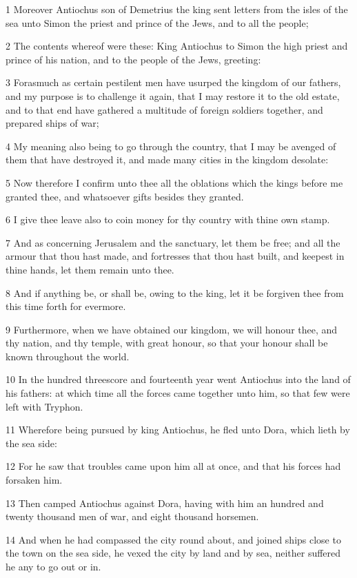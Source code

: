 \par 1 Moreover Antiochus son of Demetrius the king sent letters from the isles of the sea unto Simon the priest and prince of the Jews, and to all the people;
\par 2 The contents whereof were these: King Antiochus to Simon the high priest and prince of his nation, and to the people of the Jews, greeting:
\par 3 Forasmuch as certain pestilent men have usurped the kingdom of our fathers, and my purpose is to challenge it again, that I may restore it to the old estate, and to that end have gathered a multitude of foreign soldiers together, and prepared ships of war;
\par 4 My meaning also being to go through the country, that I may be avenged of them that have destroyed it, and made many cities in the kingdom desolate:
\par 5 Now therefore I confirm unto thee all the oblations which the kings before me granted thee, and whatsoever gifts besides they granted.
\par 6 I give thee leave also to coin money for thy country with thine own stamp.
\par 7 And as concerning Jerusalem and the sanctuary, let them be free; and all the armour that thou hast made, and fortresses that thou hast built, and keepest in thine hands, let them remain unto thee.
\par 8 And if anything be, or shall be, owing to the king, let it be forgiven thee from this time forth for evermore.
\par 9 Furthermore, when we have obtained our kingdom, we will honour thee, and thy nation, and thy temple, with great honour, so that your honour shall be known throughout the world.
\par 10 In the hundred threescore and fourteenth year went Antiochus into the land of his fathers: at which time all the forces came together unto him, so that few were left with Tryphon.
\par 11 Wherefore being pursued by king Antiochus, he fled unto Dora, which lieth by the sea side:
\par 12 For he saw that troubles came upon him all at once, and that his forces had forsaken him.
\par 13 Then camped Antiochus against Dora, having with him an hundred and twenty thousand men of war, and eight thousand horsemen.
\par 14 And when he had compassed the city round about, and joined ships close to the town on the sea side, he vexed the city by land and by sea, neither suffered he any to go out or in.
